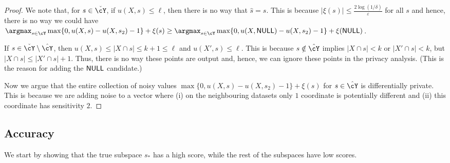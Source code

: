 \begin{proof}
    We note that, for $s \in \check \cY$, if $u(X,s) \le \ell$, then
    there is no way that $\hat s = s$. This is because
    $|\xi(s)|\le \frac{2 \log(1/\delta)}{\varepsilon}$ for all $s$ and
    hence, there is no way we could have
    $\argmax_{s \in \cY} \max\{ 0 , u(X,s) - u(X,s_2) -1\} +
    \xi(s) \ge \argmax_{s \in \cY} \max\{ 0 , u(X,\NULL) - u(X,s_2) -1\} + \xi(\NULL)$.

    If $s \in \check \cY \setminus \hat \cY$, then
    $u(X,s) \le |X \cap s| \le k+1 \le \ell$ and $u(X',s) \le \ell$.
    This is because $s \notin \hat \cY$ implies $|X \cap s| < k$ or
    $|X' \cap s| < k$, but $|X \cap s| \le |X' \cap s| +1$. Thus,
    there is no way these points are output and, hence, we can ignore
    these points in the privacy analysis. (This is the reason for adding
    the $\mathsf{NULL}$ candidate.)

    Now we argue that the entire collection of noisy values
    $\max\{ 0 , u(X,s) - u(X,s_2) -1\} + \xi(s)$ for $s \in \hat \cY$
    is differentially private.
    This is because we are adding noise to a vector where (i) on the
    neighbouring datasets only $1$ coordinate is potentially different
    and (ii) this coordinate has sensitivity $2$.
\end{proof}

\subsection{Accuracy}

We start by showing that the true subspace $s_*$ has a
high score, while the rest of the subspaces have low scores.


